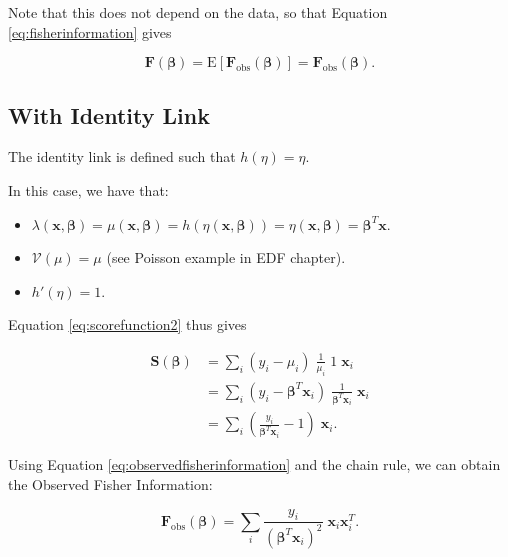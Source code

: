 \documentclass[
  12pt,
]{book}
\providecommand{\tightlist}{%
  \setlength{\itemsep}{0pt}\setlength{\parskip}{0pt}}
\begin{document}
Note that this does not depend on the data, so that Equation \eqref{eq:fisherinformation} gives

\begin{equation}
  \boldsymbol{F}(\boldsymbol{\beta}) = {\mathrm E}[\boldsymbol{F}_{\text{obs}}(\boldsymbol{\beta})] = \boldsymbol{F}_{\text{obs}}(\boldsymbol{\beta}).
\end{equation}

\subsection{With Identity Link}\label{with-identity-link}

The identity link is defined such that \(h(\eta) = \eta\).

In this case, we have that:

\begin{itemize}
\tightlist
\item
  \(\lambda(\boldsymbol{x}, \boldsymbol{\beta}) = \mu(\boldsymbol{x}, \boldsymbol{\beta}) = h(\eta(\boldsymbol{x}, \boldsymbol{\beta})) = \eta(\boldsymbol{x}, \boldsymbol{\beta}) = \boldsymbol{\beta}^T \boldsymbol{x}\).
\item
  \(\mathcal{V}(\mu) = \mu\) (see Poisson example in EDF chapter).
\item
  \(h'(\eta) = 1\).
\end{itemize}

Equation \eqref{eq:scorefunction2} thus gives

\begin{align}
  \boldsymbol{S}(\boldsymbol{\beta})
  & = \sum_{i} (y_{i} - \mu_{i})\;\frac{1}{\mu_{i}}\;1 \;\boldsymbol{x}_{i} \\
  & = \sum_{i} (y_{i} - \boldsymbol{\beta}^{T}\boldsymbol{x}_{i}) \;\frac{1}{\boldsymbol{\beta}^{T}\boldsymbol{x}_{i}}\;\boldsymbol{x}_{i} \\
  & = \sum_{i} \left( \frac{y_{i}}{ \boldsymbol{\beta}^{T}\boldsymbol{x}_{i}} - 1 \right) \;\boldsymbol{x}_{i}.
\end{align}

Using Equation \eqref{eq:observedfisherinformation} and the chain rule, we can obtain the Observed Fisher Information:

\begin{equation}
  \boldsymbol{F}_{\text{obs}}(\boldsymbol{\beta})
  = \sum_{i} \frac{y_{i}}{ (\boldsymbol{\beta}^{T}\boldsymbol{x}_{i})^{2}}\;\boldsymbol{x}_{i}\boldsymbol{x}_{i}^{T}.
\end{equation}
\end{document}
